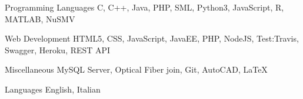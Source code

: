 

\begin{cvskills}

  \cvskill
    {Programming Languages} %
    {C, C++, Java, PHP, SML, Python3, JavaScript, R, MATLAB, NuSMV} %

  \cvskill
    {Web Development} %
    {HTML5, CSS, JavaScript, JavaEE, PHP, NodeJS, Test:Travis, Swagger, Heroku, REST API} %

  \cvskill
    {Miscellaneous} %
    {MySQL Server, Optical Fiber join, Git, AutoCAD, LaTeX} %

  \cvskill
    {Languages} %
    {English, Italian} %

\end{cvskills}
